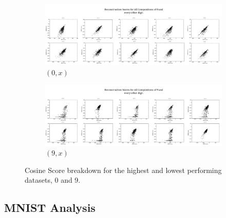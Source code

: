     \begin{figure}[h]
    \centering
    \begin{subfigure}[t]{1\textwidth}
        \includegraphics[width=\textwidth]{Assets/b.png}
        \caption{ $(0,x)$ }
      \label{F:Cosine-0-x-scores}
    \end{subfigure}
    \begin{subfigure}[t]{1\textwidth}
        \includegraphics[width=\textwidth]{Assets/(9,X)-ReconstructionScores.png}
        \caption{ $(9,x)$ }
      \label{F:Cosine-9-x-scores}
    \end{subfigure}
    \caption{Cosine Score breakdown for the highest and lowest performing datasets, 0 and 9.}\label{fig:mnist-worse-best-results}
\end{figure}


\subsection{MNIST Analysis}




